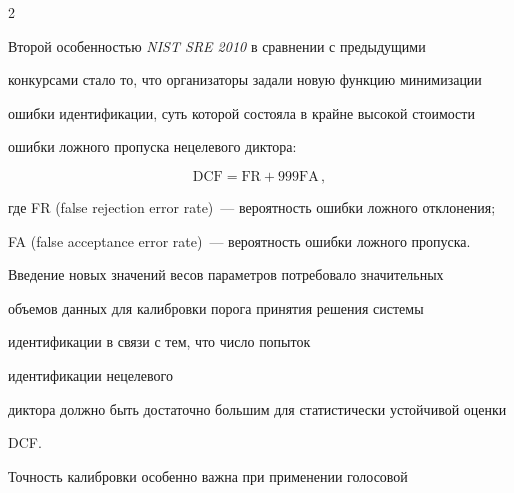 \begin{multicols}{2}
\begin{figure}
 \vspace*{-9pt}




  \end{figure}





  Второй особенностью \textit{NIST SRE 2010} в сравнении с предыдущими 


конкурсами стало то, что организаторы задали новую функцию минимизации 


ошибки идентификации, суть которой состояла в крайне высокой стоимости 


ошибки ложного пропуска нецелевого диктора:





\noindent


  $$


\mathrm{DCF = FR + 999 FA}\,,


$$


где FR (false rejection error rate)~--- вероятность \mbox{ошибки} ложного отклонения;


FA (false acceptance error rate)~--- вероятность ошибки ложного про\-пуска.





  Введение новых значений весов параметров потребовало значительных 


объемов данных для калиб\-ров\-ки порога принятия решения системы 


идентификации в связи с тем, что число попыток\linebreak\vspace*{-12pt}


\pagebreak





\noindent идентификации нецелевого 


диктора должно быть достаточно большим для статистически устойчивой оценки 


DCF. 


  


  Точность калибровки особенно важна при применении голосовой 



\end{multicols}
